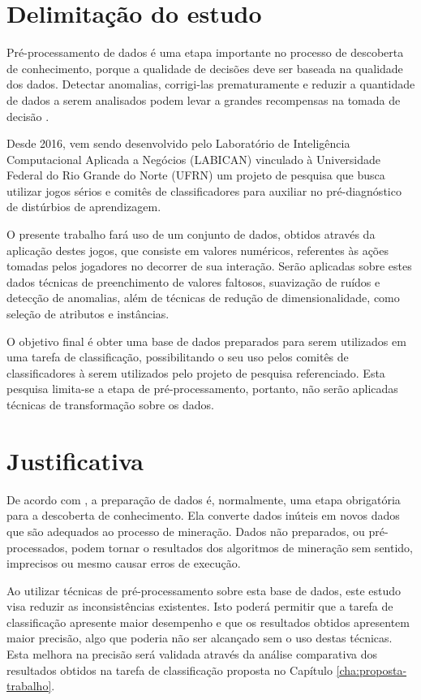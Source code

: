 \section{Delimitação do estudo}
\label{sec:delimitacao-estudo}

Pré\hyp{}processamento de dados é uma etapa importante no processo de descoberta de conhecimento, porque a qualidade de decisões deve ser baseada na qualidade dos dados. Detectar anomalias, corrigi-las prematuramente e reduzir a quantidade de dados a serem analisados podem levar a grandes recompensas na tomada de decisão \cite{han2000data}.

Desde 2016, vem sendo desenvolvido pelo Laboratório de Inteligência Computacional Aplicada a Negócios (LABICAN) vinculado à Universidade Federal do Rio Grande do Norte (UFRN) um projeto de pesquisa que busca utilizar jogos sérios e comitês de classificadores para auxiliar no pré\hyp{}diagnóstico de distúrbios de aprendizagem.

O presente trabalho fará uso de um conjunto de dados, obtidos através da aplicação destes jogos, que consiste em valores numéricos, referentes às ações tomadas pelos jogadores no decorrer de sua interação. Serão aplicadas sobre estes dados técnicas de preenchimento de valores faltosos, suavização de ruídos e detecção de anomalias, além de técnicas de redução de dimensionalidade, como seleção de atributos e instâncias.

O objetivo final é obter uma base de dados preparados para serem utilizados em uma tarefa de classificação, possibilitando o seu uso pelos comitês de classificadores à serem utilizados pelo projeto de pesquisa referenciado. Esta pesquisa limita\hyp{}se a etapa de pré\hyp{}processamento, portanto, não serão aplicadas técnicas de transformação sobre os dados.

\section{Justificativa}
\label{sec:justificativa}

De acordo com , a preparação de dados é, normalmente, uma etapa obrigatória para a descoberta de conhecimento. Ela converte dados inúteis em novos dados que são adequados ao processo de mineração. Dados não preparados, ou pré\hyp{}processados, podem tornar o resultados dos algoritmos de mineração sem sentido, imprecisos ou mesmo causar erros de execução.

Ao utilizar técnicas de pré\hyp{}processamento sobre esta base de dados, este estudo visa reduzir as inconsistências existentes. Isto poderá permitir que a tarefa de classificação apresente maior desempenho  e que os resultados obtidos apresentem maior precisão, algo que poderia não ser alcançado sem o uso destas técnicas. Esta melhora na precisão será validada através da análise comparativa dos resultados obtidos na tarefa de classificação proposta no Capítulo \ref{cha:proposta-trabalho}.

